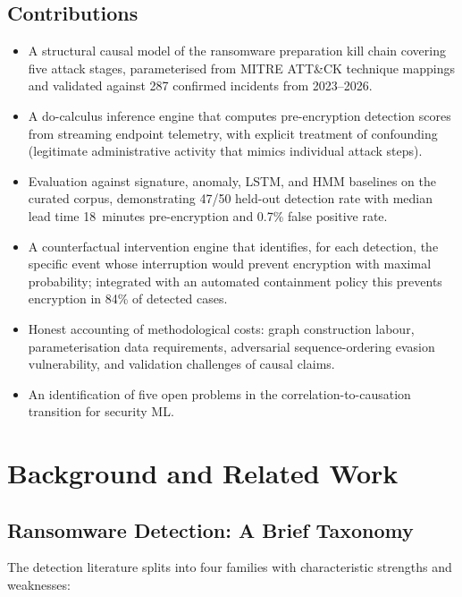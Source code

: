 \documentclass[sigconf,nonacm]{acmart}
\begin{document}
\subsection{Contributions}

\begin{itemize}
  \item A structural causal model of the ransomware preparation kill
        chain covering five attack stages, parameterised from MITRE
        ATT\&CK technique mappings and validated against 287 confirmed
        incidents from 2023--2026.
  \item A do-calculus inference engine that computes pre-encryption
        detection scores from streaming endpoint telemetry, with
        explicit treatment of confounding (legitimate administrative
        activity that mimics individual attack steps).
  \item Evaluation against signature, anomaly, LSTM, and HMM baselines
        on the curated corpus, demonstrating 47/50 held-out detection
        rate with median lead time 18~minutes pre-encryption and
        0.7\% false positive rate.
  \item A counterfactual intervention engine that identifies, for each
        detection, the specific event whose interruption would prevent
        encryption with maximal probability; integrated with an
        automated containment policy this prevents encryption in 84\%
        of detected cases.
  \item Honest accounting of methodological costs: graph construction
        labour, parameterisation data requirements, adversarial
        sequence-ordering evasion vulnerability, and validation
        challenges of causal claims.
  \item An identification of five open problems in the
        correlation-to-causation transition for security ML.
\end{itemize}

\section{Background and Related Work}

\subsection{Ransomware Detection: A Brief Taxonomy}

The detection literature splits into four families with characteristic
strengths and weaknesses:
\end{document}
